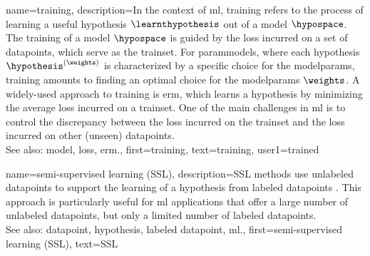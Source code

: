{name={training}, 
	description={In the context of \gls{ml}, training refers to the process 
		of learning a useful \gls{hypothesis} $\learnthypothesis$ out of a \gls{model} $\hypospace$. 
		The training of a \gls{model} $\hypospace$ is guided by the \gls{loss} incurred on a set 
		of \glspl{datapoint}, which serve as the \gls{trainset}. For \glspl{parammodel}, 
		where each \gls{hypothesis} $\hypothesis^{(\weights)}$ is characterized by a specific 
		choice for the \glspl{modelparam}, training amounts to finding an optimal choice for the 
		\glspl{modelparam} $\weights$. A widely-used approach to training is \gls{erm}, which 
		learns a \gls{hypothesis} by minimizing the average \gls{loss} incurred on a \gls{trainset}. 
		One of the main challenges in \gls{ml} is to control the \gls{discrepancy} between the 
		\gls{loss} incurred on the \gls{trainset} and the \gls{loss} incurred on other (unseen) \glspl{datapoint}.
				\\
		See also: \gls{model}, \gls{loss}, \gls{erm}.},
	first={training},
	text={training}, 
	user1={trained}
}

{name={semi-supervised learning (SSL)}, 
	description={SSL methods use unlabeled \glspl{datapoint}
		to support the learning of a \gls{hypothesis} from \glspl{labeled datapoint} \cite{SemiSupervisedBook}. 
		This approach is particularly useful for \gls{ml} applications that offer a large number of 
		unlabeled \glspl{datapoint}, but only a limited number of \glspl{labeled datapoint}.
			\\
		See also: \gls{datapoint}, \gls{hypothesis}, \gls{labeled datapoint}, \gls{ml}.}, 
	first={semi-supervised learning (SSL)},
	text={SSL} 
}
	
